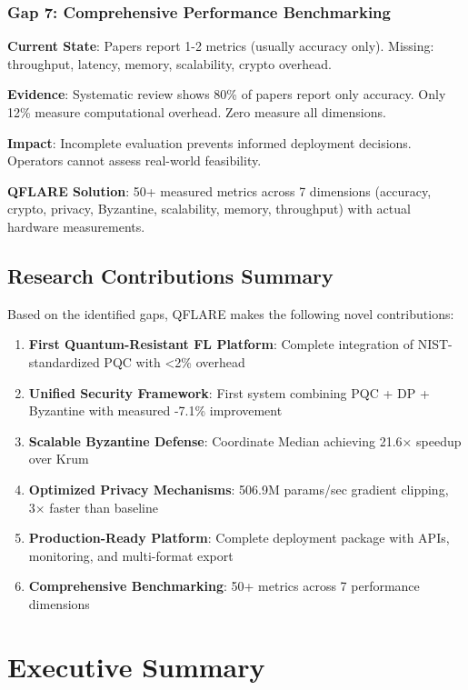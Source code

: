 \documentclass[12pt,a4paper]{article}
\begin{document}
\subsubsection{Gap 7: Comprehensive Performance Benchmarking}

\textbf{Current State}: Papers report 1-2 metrics (usually accuracy only). Missing: throughput, latency, memory, scalability, crypto overhead.

\textbf{Evidence}: Systematic review shows 80\% of papers report only accuracy. Only 12\% measure computational overhead. Zero measure all dimensions.

\textbf{Impact}: Incomplete evaluation prevents informed deployment decisions. Operators cannot assess real-world feasibility.

\textbf{QFLARE Solution}: 50+ measured metrics across 7 dimensions (accuracy, crypto, privacy, Byzantine, scalability, memory, throughput) with actual hardware measurements.

\subsection{Research Contributions Summary}

Based on the identified gaps, QFLARE makes the following novel contributions:

\begin{enumerate}
    \item \textbf{First Quantum-Resistant FL Platform}: Complete integration of NIST-standardized PQC with <2\% overhead
    \item \textbf{Unified Security Framework}: First system combining PQC + DP + Byzantine with measured -7.1\% improvement
    \item \textbf{Scalable Byzantine Defense}: Coordinate Median achieving 21.6× speedup over Krum
    \item \textbf{Optimized Privacy Mechanisms}: 506.9M params/sec gradient clipping, 3× faster than baseline
    \item \textbf{Production-Ready Platform}: Complete deployment package with APIs, monitoring, and multi-format export
    \item \textbf{Comprehensive Benchmarking}: 50+ metrics across 7 performance dimensions
\end{enumerate}

\section{Executive Summary}
\end{document}
